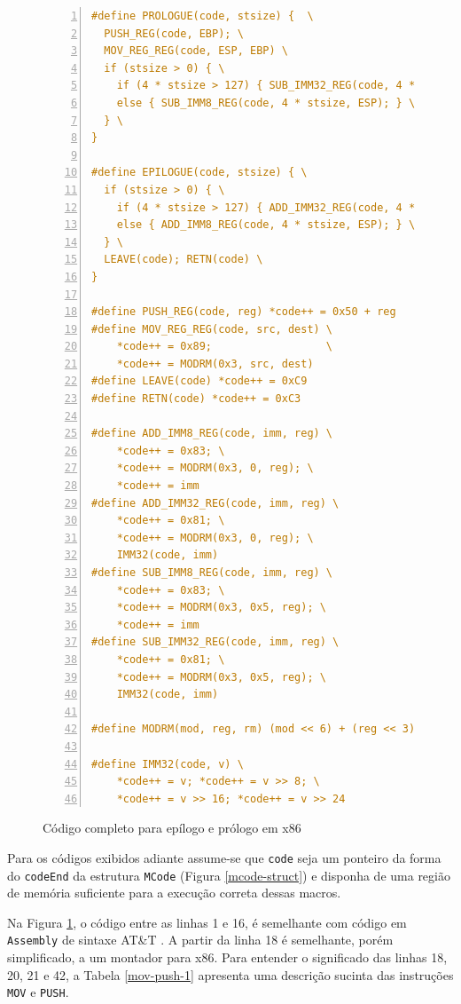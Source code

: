 \begin{figure}[ht!]
  \centering
  \begin{lstlisting}[language=C, numbers=left]
#define PROLOGUE(code, stsize) {  \
  PUSH_REG(code, EBP); \
  MOV_REG_REG(code, ESP, EBP) \
  if (stsize > 0) { \
    if (4 * stsize > 127) { SUB_IMM32_REG(code, 4 * stsize, ESP); } \
    else { SUB_IMM8_REG(code, 4 * stsize, ESP); } \
  } \
}

#define EPILOGUE(code, stsize) { \
  if (stsize > 0) { \
    if (4 * stsize > 127) { ADD_IMM32_REG(code, 4 * stsize, ESP); } \
    else { ADD_IMM8_REG(code, 4 * stsize, ESP); } \
  } \
  LEAVE(code); RETN(code) \
}

#define PUSH_REG(code, reg) *code++ = 0x50 + reg
#define MOV_REG_REG(code, src, dest) \
    *code++ = 0x89;                  \
    *code++ = MODRM(0x3, src, dest)
#define LEAVE(code) *code++ = 0xC9
#define RETN(code) *code++ = 0xC3

#define ADD_IMM8_REG(code, imm, reg) \
    *code++ = 0x83; \
    *code++ = MODRM(0x3, 0, reg); \
    *code++ = imm
#define ADD_IMM32_REG(code, imm, reg) \
    *code++ = 0x81; \
    *code++ = MODRM(0x3, 0, reg); \
    IMM32(code, imm)
#define SUB_IMM8_REG(code, imm, reg) \
    *code++ = 0x83; \
    *code++ = MODRM(0x3, 0x5, reg); \
    *code++ = imm
#define SUB_IMM32_REG(code, imm, reg) \
    *code++ = 0x81; \
    *code++ = MODRM(0x3, 0x5, reg); \
    IMM32(code, imm)

#define MODRM(mod, reg, rm) (mod << 6) + (reg << 3) + rm

#define IMM32(code, v) \
    *code++ = v; *code++ = v >> 8; \
    *code++ = v >> 16; *code++ = v >> 24
  \end{lstlisting}
  \caption{Código completo para epílogo e prólogo em x86\label{prologo-epilogo}}
\end{figure}

Para os códigos exibidos adiante assume-se que \verb!code! seja um
ponteiro da forma do \verb!codeEnd!
da estrutura \verb!MCode! (Figura \ref{mcode-struct}) e disponha de
uma região de memória suficiente para a execução correta dessas macros.

Na Figura \ref{prologo-epilogo}, o código entre as linhas 1 e 16, é
semelhante com código em \texttt{Assembly} \cite{assembly1} de sintaxe
AT\&T \cite{sintaxeatt}. A partir da linha 18 é semelhante, porém
simplificado, a um montador para x86. Para entender o significado das
linhas 18, 20, 21 e 42, a Tabela \ref{mov-push-1} apresenta uma descrição
sucinta das instruções \verb!MOV! e \verb!PUSH!.

